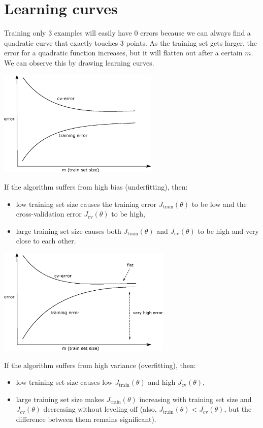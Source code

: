 \documentclass[a4paper,11pt]{report}
\begin{document}
\section{Learning curves}

Training only 3 examples will easily have 0 errors because we can always find a quadratic curve that exactly touches 3 points. As the training set gets larger, the error for a quadratic function increases, but it will flatten  out after a certain $m$. We can observe this by drawing learning curves.
\begin{center}
\includegraphics[height = 2in]{ml_images/learn_curve}
\end{center}

If the algorithm suffers from high bias (underfitting), then:
\begin{itemize}
  \item low training set size causes the training error $J_\textrm{train}(\theta)$ to be low and the cross-validation error $J_\textrm{cv}(\theta)$ to be high,
  \item large training set size causes both $J_\textrm{train}(\theta)$ and $J_\textrm{cv}(\theta)$ to be high and very close to each other.
\end{itemize}

\begin{center}
\includegraphics[height = 2in]{ml_images/learn_curve_bias}
\end{center}

If the algorithm suffers from high variance (overfitting), then:
\begin{itemize}
\item low training set size causes low $J_\textrm{train}(\theta)$ and high $J_\textrm{cv}(\theta)$,
\item large training set size makes $J_\textrm{train}(\theta)$ increasing with training set size and $J_\textrm{cv}(\theta)$ decreasing without leveling off (also, $J_\textrm{train}(\theta) < J_\textrm{cv}(\theta)$, but the difference between them remains significant).
\end{itemize}
\end{document}

